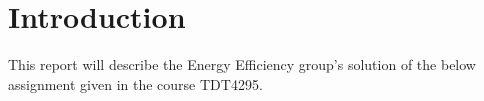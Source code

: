 \chapter{Introduction}\label{chapter:intro}

This report will describe the Energy Efficiency group's solution of the below assignment
given in the course TDT4295.

\clearpage

\clearpage

